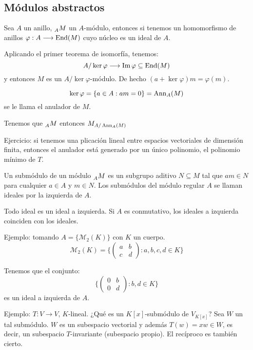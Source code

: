 \subsection{Módulos abstractos}

Sea \(A\) un anillo, \(\prescript{}{A}{M}\) un \(A\)-módulo,
entonces si tenemos
un homomorfismo de anillos \(\varphi:A\longrightarrow\operatorname{End}(M)\)
cuyo núcleo es un ideal de \(A\).

Aplicando el primer teorema de isomorfía, tenemos:
\[
  A/\ker\varphi\longrightarrow\Im\varphi\subseteq\operatorname{End}(M)
\]
y entonces \(M\) es un \(A/\ker\varphi\)-módulo.
De hecho \((a+\ker\varphi)m=\varphi(m)\).

\[
  \ker\varphi=\{a\in A: am=0\}=\operatorname{Ann}_A(M)
\]
se le llama el anulador de \(M\).

Tenemos que \(\prescript{}{A}{M}\) entonces \(M_{A/\operatorname{Ann}_A(M)}\)

Ejercicio: si tenemos una plicación lineal entre espacios vectoriales
de dimensión finita, entonces el anulador está generado por un único
polinomio, el polinomio mínimo de \(T\).

\begin{df}
  Un submódulo de un módulo \(\prescript{}{A}{M}\) es un subgrupo aditivo \(N\subseteq M\)
  tal que \(am\in N\) para cualquier \(a\in A\) y \(m\in N\). Los
  submódulos del módulo regular \(A\) se llaman ideales por la izquierda
  de \(A\).
\end{df}

\begin{obs}
  Todo ideal es un ideal a izquierda. Si \(A\) es conmutativo, los ideales
  a izquierda coinciden con los ideales.
\end{obs}

Ejemplo: tomando \(A=\{\mathcal{M}_2(K)\}\) con \(K\) un cuerpo.
\[
  \mathcal{M}_2(K)=\{
    \begin{pmatrix}
      a&b\\
      c&d
    \end{pmatrix}:
    a,b,c,d\in K
  \}
\]

Tenemos que el conjunto:
\[
  \{
    \begin{pmatrix}
      0&b\\
      0&d
    \end{pmatrix}:
    b,d\in K
  \}
\]
es un ideal a izquierda de \(A\).

Ejemplo: \(T:V\longrightarrow V\), \(K\)-lineal.
¿Qué es un \(K[x]\)-submódulo de \(V_{K[x]}\)?
Sea \(W\) un tal submódulo.
\(W\) es un subespacio vectorial y además \(T(w)=xw\in W\),
es decir, un subespacio \(T\)-invariante (subespacio propio).
El recíproco es también cierto.

